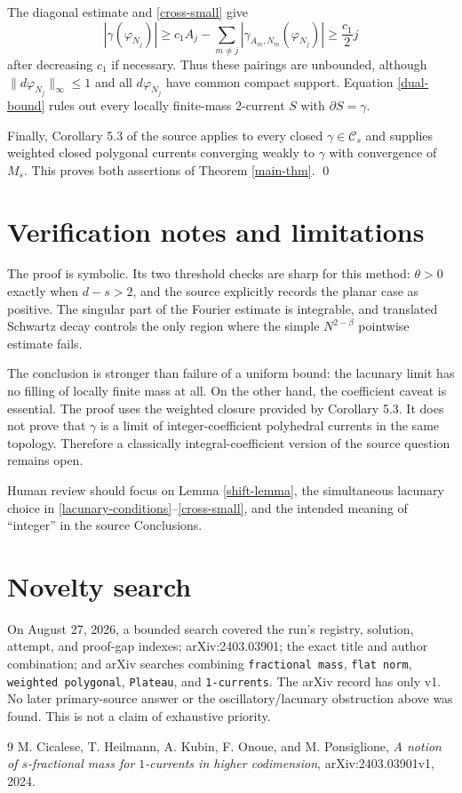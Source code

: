 \documentclass[11pt]{article}
\newcommand{\Cs}{\mathcal{C}_s}
\begin{document}
The diagonal estimate and \eqref{cross-small} give
\[
 |\gamma(\varphi_{N_j})|
 \ge c_1A_j-\sum_{m\ne j}
      |\gamma_{A_m,N_m}(\varphi_{N_j})|
 \ge \frac{c_1}{2}j
\]
after decreasing $c_1$ if necessary.  Thus these pairings are unbounded,
although $\|d\varphi_{N_j}\|_\infty\le1$ and all $d\varphi_{N_j}$ have common
compact support.  Equation \eqref{dual-bound} rules out every locally
finite-mass 2-current $S$ with $\partial S=\gamma$.

Finally, Corollary 5.3 of the source applies to every closed
$\gamma\in\Cs$ and supplies weighted closed polygonal currents converging
weakly to $\gamma$ with convergence of $M_s$.  This proves both assertions of
Theorem \ref{main-thm}. \qed

\section{Verification notes and limitations}

The proof is symbolic.  Its two threshold checks are sharp for this method:
$\theta>0$ exactly when $d-s>2$, and the source explicitly records the planar
case as positive.  The singular part of the Fourier estimate is integrable,
and translated Schwartz decay controls the only region where the simple
$N^{2-\beta}$ pointwise estimate fails.

The conclusion is stronger than failure of a uniform bound: the lacunary
limit has no filling of locally finite mass at all.  On the other hand, the
coefficient caveat is essential.  The proof uses the weighted closure provided
by Corollary 5.3.  It does not prove that $\gamma$ is a limit of
integer-coefficient polyhedral currents in the same topology.  Therefore a
classically integral-coefficient version of the source question remains open.

Human review should focus on Lemma \ref{shift-lemma}, the simultaneous
lacunary choice in \eqref{lacunary-conditions}--\eqref{cross-small}, and the
intended meaning of ``integer'' in the source Conclusions.

\section{Novelty search}

On August 27, 2026, a bounded search covered the run's registry, solution,
attempt, and proof-gap indexes; arXiv:2403.03901; the exact title and author
combination; and arXiv searches combining \texttt{fractional mass},
\texttt{flat norm}, \texttt{weighted polygonal}, \texttt{Plateau}, and
\texttt{1-currents}.  The arXiv record has only v1.  No later primary-source
answer or the oscillatory/lacunary obstruction above was found.  This is not a
claim of exhaustive priority.

\begin{thebibliography}{9}
M. Cicalese, T. Heilmann, A. Kubin, F. Onoue, and M. Ponsiglione,
\emph{A notion of $s$-fractional mass for $1$-currents in higher codimension},
arXiv:2403.03901v1, 2024.
\end{thebibliography}
\end{document}
